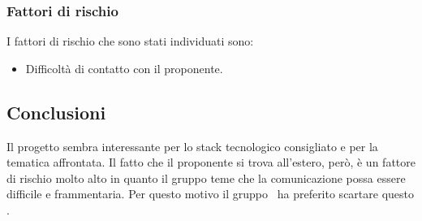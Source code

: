 \documentclass[../StudioDiFattibilita.tex]{subfiles}
\begin{document}
			\subsubsection{Fattori di rischio}
			I fattori di rischio che sono stati individuati sono:
			\begin{itemize}
				\item Difficoltà di contatto con il proponente.
			\end{itemize}
			\subsection{Conclusioni}
			Il progetto sembra interessante per lo stack tecnologico consigliato e per la tematica affrontata. Il fatto che il proponente si trova all'estero, però, è un fattore di rischio molto alto in quanto il gruppo teme che la comunicazione possa essere difficile e frammentaria. Per questo motivo il gruppo \kaleidoscode\ ha preferito scartare questo .
\end{document}
